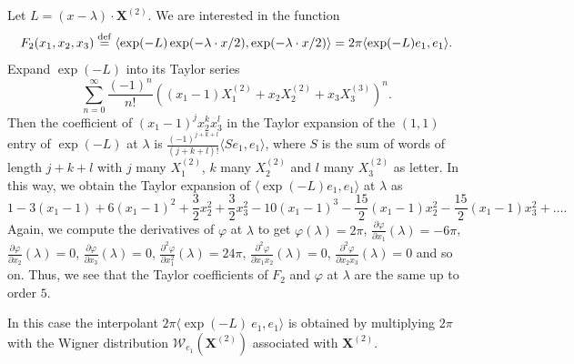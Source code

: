 \documentclass[11pt,reqno]{amsart}
\theoremstyle{plain}
\theoremstyle{definition}
\numberwithin{equation}{section}
\newcommand{\bydef}{\stackrel{\rm def}{=}}
\begin{document}
Let $L=(x-\lambda) \cdot \boldsymbol{X}^{(2)}$.
We are interested in the function 
$$F_2(x_1, x_2, x_3) \bydef \langle \exp(-L) \exp(-\lambda \cdot x /2), \exp(-\lambda \cdot x /2) \rangle = 2\pi \langle \exp(-L) e_1, e_1 \rangle.$$
Expand $\exp(-L)$ into its Taylor series 
$$\sum_{n=0}^\infty \frac{(-1)^n}{n!} ((x_1-1)X^{(2)}_1 + x_2 X^{(2)}_2 + x_3 X^{(3)}_3 )^n.$$ Then the coefficient of $(x_1-1)^j x^k_2 x^l_3$ in the Taylor expansion of the $(1,1)$ entry of $\exp(-L)$ at $\lambda$ is $\frac{(-1)^{j+k+l}}{(j+k+l)!}\langle S e_1, e_1 \rangle$, where $S$ is the sum of words of length $j+k+l$ with $j$ many $X^{(2)}_1$, $k$ many $X^{(2)}_2$ and $l$ many $X^{(2)}_3$ as letter. In this way, we obtain the Taylor expansion of $\langle \exp(-L) e_1, e_1 \rangle$ at $\lambda$ as 
$$
 1 - 3(x_1-1) + 6(x_1-1)^2 + \frac{3}{2}x_2^2 + \frac{3}{2}x^2_3 - 10(x_1-1)^3 - \frac{15}{2}(x_1-1)x^2_2 - \frac{15}{2}(x_1-1)x_3^2 + \dots.
$$
Again, we compute the derivatives of $\varphi$ at $\lambda$ to get
$\varphi(\lambda) = 2\pi$, $\frac{\partial \varphi}{\partial x_1}(\lambda) = -6\pi$, $\frac{\partial \varphi}{\partial x_2}(\lambda) = 0$, $\frac{\partial \varphi}{\partial x_3}(\lambda) = 0$, $\frac{\partial^2 \varphi}{\partial x_1^2}(\lambda) = 24\pi$, $\frac{\partial^2 \varphi}{\partial x_1 x_2}(\lambda) = 0 $, $\frac{\partial^2 \varphi}{\partial x_2 x_3}(\lambda) = 0$ and so on. Thus, we see that the Taylor coefficients of $F_2$ and $\varphi$ at $\lambda$ are the same up to order $5$.



In this case the interpolant $2\pi \langle \exp(-L)\ e_1, e_1 \rangle$ is obtained by multiplying $2\pi$ with the Wigner distribution $\mathcal{W}_{e_1}(\boldsymbol{X}^{(2)})$ associated with $\boldsymbol{X}^{(2)}$. 





\vspace{2mm}
\end{document}
